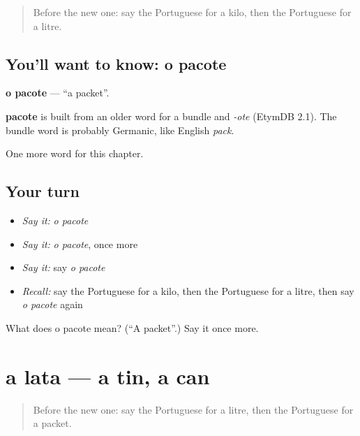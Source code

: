 \label{lesson:PT-C198-pacote}



\begin{quote}
Before the new one: say the Portuguese for a kilo, then the Portuguese for a litre.
\end{quote}

\subsection*{You'll want to know: o pacote}
\textbf{o pacote} — \textquotedblleft{}a packet\textquotedblright{}.

\begin{cousinweb}
\textbf{pacote} is built from an older word for a bundle and \emph{-ote} (EtymDB 2.1). The bundle word is probably Germanic, like English \emph{pack}.
\end{cousinweb}

\begin{grammarlens}[title={What you've built}]
One more word for this chapter.
\end{grammarlens}

\subsection*{Your turn}
\begin{itemize}
\raggedright
  \item \emph{Say it:} \emph{o pacote}
  \item \emph{Say it:} \emph{o pacote}, once more
  \item \emph{Say it:} say \emph{o pacote}
  \item \emph{Recall:} say the Portuguese for a kilo, then the Portuguese for a litre, then say \emph{o pacote} again
\end{itemize}

\begin{tcolorbox}[breakable,colback=teal!4,colframe=teal!35!black,title={Before you move on}]
What does o pacote mean? (\textquotedblleft{}A packet\textquotedblright{}.) Say it once more.
\end{tcolorbox}
\section[a lata]{a lata — a tin, a can}

\label{lesson:PT-C198-lata}



\begin{quote}
Before the new one: say the Portuguese for a litre, then the Portuguese for a packet.
\end{quote}

